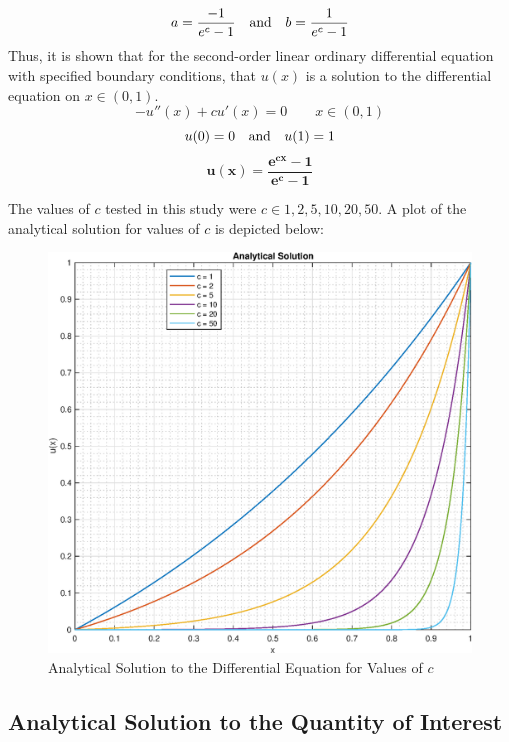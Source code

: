 \documentclass[10pt, reqno]{article}		%
\numberwithin{equation}{section}
\begin{document}
\begin{equation}
a = \frac{-1}{e^c-1} \quad \textnormal{and} \quad b = \frac{1}{e^c-1}
\end{equation}
Thus, it is shown that for the second-order linear ordinary differential equation with specified boundary conditions, that $u(x)$ is a solution to the differential equation on $x \in (0, 1)$.
\begin{equation}
-u''(x)+cu'(x)=0 \qquad x \in (0, 1)
\end{equation}
\begin{equation}
u(0) = 0 \quad \textnormal{and} \quad u(1) = 1 
\end{equation}
\begin{equation}
\mathbf{u(x) = \frac{e^{cx}-1}{e^c-1}}
\end{equation}

\newpage

The values of $c$ tested in this study were $c \in {1, 2, 5, 10, 20, 50}$. A plot of the analytical solution for values of $c$ is depicted below:
\begin{figure}[H]
	\begin{center}
		\includegraphics[width = 0.8\linewidth]{analytical_solution}
		\caption{Analytical Solution to the Differential Equation for Values of $c$}
	\end{center}
\end{figure}

\newpage

\subsection{Analytical Solution to the Quantity of Interest}
\end{document}
